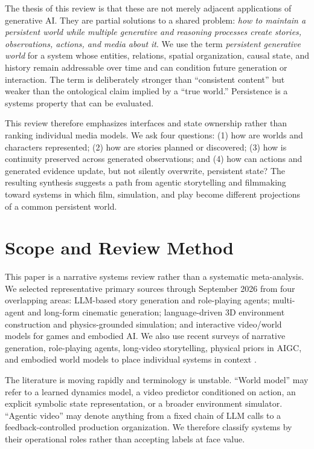 \documentclass{article}
\begin{document}
The thesis of this review is that these are not merely adjacent applications of generative AI. They are partial solutions to a shared problem: \emph{how to maintain a persistent world while multiple generative and reasoning processes create stories, observations, actions, and media about it}. We use the term \emph{persistent generative world} for a system whose entities, relations, spatial organization, causal state, and history remain addressable over time and can condition future generation or interaction. The term is deliberately stronger than “consistent content” but weaker than the ontological claim implied by a “true world.” Persistence is a systems property that can be evaluated.

This review therefore emphasizes interfaces and state ownership rather than ranking individual media models. We ask four questions: (1) how are worlds and characters represented; (2) how are stories planned or discovered; (3) how is continuity preserved across generated observations; and (4) how can actions and generated evidence update, but not silently overwrite, persistent state? The resulting synthesis suggests a path from agentic storytelling and filmmaking toward systems in which film, simulation, and play become different projections of a common persistent world.

\section{Scope and Review Method}

This paper is a narrative systems review rather than a systematic meta-analysis. We selected representative primary sources through September 2026 from four overlapping areas: LLM-based story generation and role-playing agents; multi-agent and long-form cinematic generation; language-driven 3D environment construction and physics-grounded simulation; and interactive video/world models for games and embodied AI. We also use recent surveys of narrative generation, role-playing agents, long-video storytelling, physical priors in AIGC, and embodied world models to place individual systems in context \citep{liu2026narrativesurvey,wang2026roleplaysurvey,elmoghany2025longvideosurvey,meng2025physicalpriors,li2025worldmodelsurvey}.

The literature is moving rapidly and terminology is unstable. “World model” may refer to a learned dynamics model, a video predictor conditioned on action, an explicit symbolic state representation, or a broader environment simulator. “Agentic video” may denote anything from a fixed chain of LLM calls to a feedback-controlled production organization. We therefore classify systems by their operational roles rather than accepting labels at face value.
\end{document}
